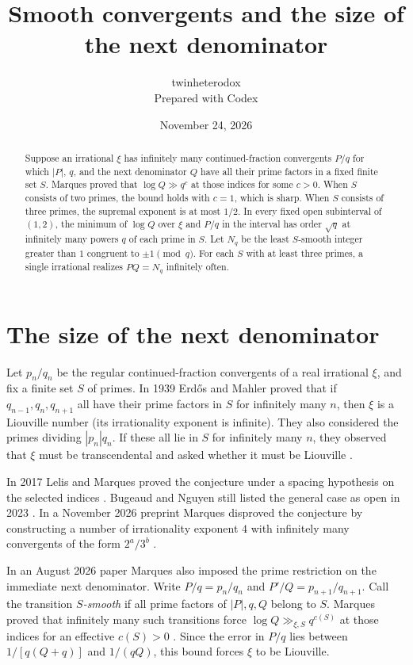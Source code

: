 \documentclass[11pt]{article}
\title{Smooth convergents and the size of the next denominator}
\author{twinheterodox\\[-1pt]{\small Prepared with Codex}}
\date{November 24, 2026}
\begin{document}
\maketitle
\vspace{-1.5\baselineskip}
\begin{abstract}
Suppose an irrational $\xi$ has infinitely many continued-fraction convergents
$P/q$ for which $|P|$, $q$, and the next denominator $Q$ have all their prime
factors in a fixed finite set $S$. Marques proved that $\log Q\gg q^c$ at
those indices for some $c>0$. When $S$ consists of two primes, the bound
holds with $c=1$, which is sharp. When $S$ consists of three primes, the
supremal exponent is at most $1/2$. In every fixed open subinterval of
$(1,2)$, the minimum of $\log Q$ over $\xi$ and $P/q$ in the interval
has order $\sqrt q$ at infinitely many powers $q$ of each prime in $S$.
Let $N_q$ be the least $S$-smooth integer greater than $1$ congruent to
$\pm1\pmod q$. For each $S$ with at least three primes, a
single irrational realizes $P Q=N_q$ infinitely often.
\end{abstract}
\vspace{-0.6\baselineskip}

\section{The size of the next denominator}
Let $p_n/q_n$ be the regular continued-fraction convergents of a real
irrational $\xi$, and fix a finite set $S$ of primes. In 1939 Erd\H{o}s
and Mahler proved that if $q_{n-1},q_n,q_{n+1}$ all have their prime
factors in $S$ for infinitely many $n$, then $\xi$ is a Liouville number
(its irrationality exponent is infinite). They also considered the primes
dividing $|p_n|q_n$. If these all lie in $S$ for infinitely many $n$,
they observed that $\xi$ must be transcendental and asked whether it
must be Liouville \cite[pp.~17--18]{em}.

In 2017 Lelis and Marques proved the conjecture under a spacing hypothesis
on the selected indices \cite[Theorem~1.1]{lm}. Bugeaud and Nguyen still
listed the general case as open in 2023 \cite[Question~4.1]{bn}. In a
November 2026 preprint Marques disproved the conjecture by constructing a
number of irrationality exponent $4$ with infinitely many convergents of
the form $2^a/3^b$ \cite{counter}.

In an August 2026 paper Marques also imposed the prime restriction on the
immediate next denominator. Write $P/q=p_n/q_n$ and $P'/Q=p_{n+1}/q_{n+1}$.
Call the transition
\emph{$S$-smooth} if all prime factors of $|P|,q,Q$ belong to $S$.
Marques proved that infinitely many such transitions force
$\log Q\gg_{\xi,S}q^{c(S)}$ at those indices for an
effective $c(S)>0$ \cite[Theorem~1.1]{marques}. Since the error in $P/q$
lies between $1/[q(Q+q)]$ and $1/(qQ)$, this bound forces $\xi$ to be
Liouville.
\end{document}
